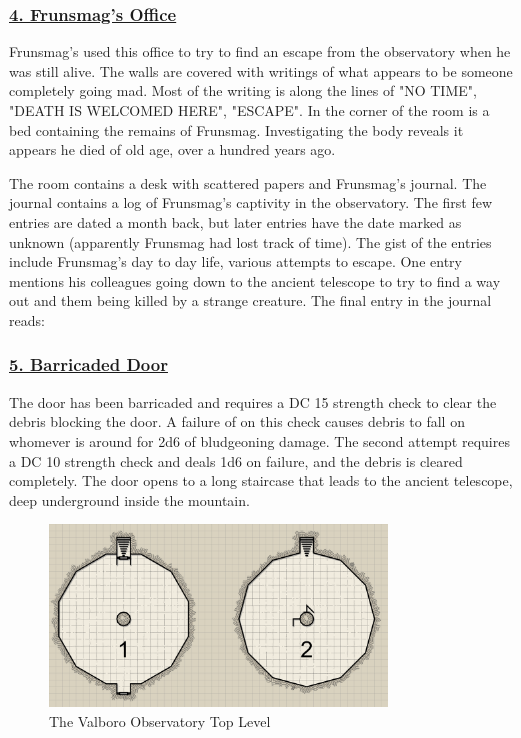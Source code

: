 \documentclass{article}
\begin{document}
\begin{multicols*}{2}
	\subsubsection*{\underline{4. Frunsmag's Office}}
	Frunsmag's used this office to try to find an escape from the observatory when he was still alive. The walls are covered with writings of what appears to be someone completely going mad. Most of the writing is along the lines of "NO TIME", "DEATH IS WELCOMED HERE", "ESCAPE". In the corner of the room is a bed containing the remains of Frunsmag. Investigating the body reveals it appears he died of old age, over a hundred years ago.
	
	The room contains a desk with scattered papers and Frunsmag's journal. The journal contains a log of Frunsmag's captivity in the observatory. The first few entries are dated a month back, but later entries have the date marked as unknown (apparently Frunsmag had lost track of time). The gist of the entries include Frunsmag's day to day life, various attempts to escape. One entry mentions his colleagues going down to the ancient telescope to try to find a way out and them being killed by a strange creature. The final entry in the journal reads:
	
	
	
	\subsubsection*{\underline{5. Barricaded Door}}
	The door has been barricaded and requires a DC 15 strength check to clear the debris blocking the door. A failure of on this check causes debris to fall on whomever is around for 2d6 of bludgeoning damage. The second attempt requires a DC 10 strength check and deals 1d6 on failure, and the debris is cleared completely. The door opens to a long staircase that leads to the ancient telescope, deep underground inside the mountain.
	
	\begin{figure}
	\centering
	\includegraphics[width=0.8\textwidth]{images/ancient_telescope}
	\caption{The Valboro Observatory Top Level}
	\end{figure}

\end{multicols*}
\end{document}
